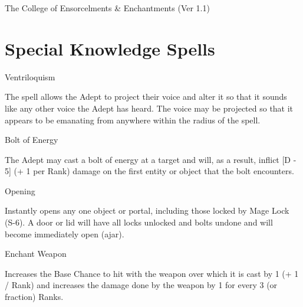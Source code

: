 \begin{Chapter}{The College of Ensorcelments \& Enchantments (Ver 1.1)}
\section{Special Knowledge Spells}


\begin{spell}[S-1]{Ventriloquism}
\begin{effects}
The spell allows the Adept to project their voice and alter it so that
it sounds like any other voice the Adept has heard. The voice may be
projected so that it appears to be emanating from anywhere within the
radius of the spell.
\end{effects}
\end{spell}

\begin{spell}[S-2]{Bolt of Energy }

\begin{effects}
The Adept may cast a bolt of energy at a target and will, as a result,
inflict [D - 5] (+ 1 per Rank) damage on the first entity or object
that the bolt encounters.
\end{effects}
\end{spell}

\begin{spell}[S-3]{Opening }

\begin{effects}
Instantly opens any one object or portal, including those locked by
Mage Lock (S-6).  A door or lid will have all locks unlocked and bolts
undone and will become immediately open (ajar).
\end{effects}
\end{spell}

\begin{spell}[S-4]{Enchant Weapon }

\begin{effects}
Increases the Base Chance to hit with the weapon over which it is cast
by 1 (+ 1 / Rank) and increases the damage done by the weapon by 1 for
every 3 (or fraction) Ranks.
\end{effects}
\end{spell}


\end{Chapter}
